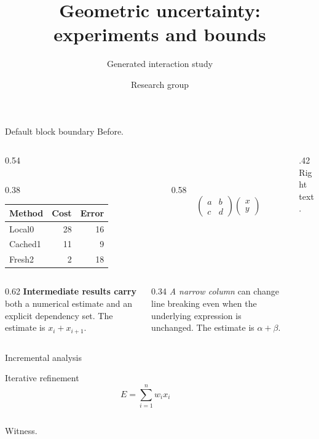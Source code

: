 \documentclass[9pt,aspectratio=43]{beamer}
\title{Geometric uncertainty: experiments and bounds}
\subtitle{Generated interaction study}
\author{Research group}
\date{}
\begin{document}
\begin{frame}[t,shrink=5]{Default block boundary}
Before.\par\begin{columns}[onlytextwidth,c]\begin{column}{0.54\textwidth}
\begin{description}
\item<1->[Stage 1] \begin{columns}[onlytextwidth,t]
\begin{column}{0.38\textwidth}
\begin{tabular}{lrr}Method&Cost&Error\\\hline
Local0&28&16\\
Cached1&11&9\\
Fresh2&2&18\\
\end{tabular}
\end{column}
\begin{column}{0.58\textwidth}
\[\begin{pmatrix}a&b\\c&d\end{pmatrix}\begin{pmatrix}x\\y\end{pmatrix}\]
\end{column}
\end{columns}
\item<2->[Stage 2] \begin{columns}[onlytextwidth,b]
\begin{column}{0.62\textwidth}
\textbf{Intermediate results carry} both a numerical estimate and an explicit dependency set.  The estimate is $x_i+x_{i+1}$.
\end{column}
\begin{column}{0.34\textwidth}
\textit{A narrow column} can change line breaking even when the underlying expression is unchanged.  The estimate is $\alpha+\beta$.
\end{column}
\end{columns}
\item<3->[Stage 3] \begin{block}{Incremental analysis}
\begin{block}{Iterative refinement}
\[E=\sum_{i=1}^{n}w_i x_i\]
\end{block}
\end{block}
\end{description}
\end{column}\begin{column}{.42\textwidth}Right text.\end{column}\end{columns}\par Witness.\end{frame}
\end{document}

